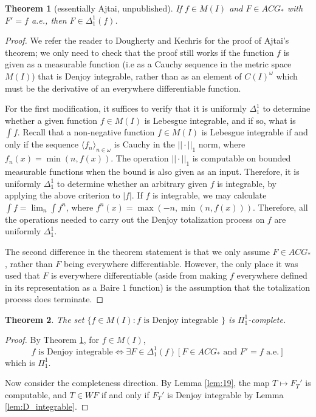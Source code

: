 \documentclass[12pt]{amsart}
\newtheorem{theorem}{Theorem}
\newcommand{\august}[1]{#1}%
\newcommand{\mathaugust}{}%
\begin{document}
\begin{theorem}[essentially Ajtai, unpublished]\label{ajtai}
\august{If $f \in M(I)$ and $F \in ACG_\ast$ with $F' = f$ a.e., then $F \in \Delta^1_1(f)$.}
\end{theorem}
\begin{proof}
\august{We refer the reader to Dougherty and Kechris }\cite[pg. 162]{dk} 
\august{for 
the proof of Ajtai's theorem; we only need to check that the proof 
still works if the function $f$ is 
given as a  
measurable function (i.e as a Cauchy sequence in the 
metric space $M(I)$) that is Denjoy integrable, 
rather than as an element of $C(I)^\omega$
which must be 
the derivative of an everywhere differentiable function.

For the first modification, it suffices to verify that 
it is uniformly $\Delta^1_1$
to determine whether a given function $f \in M(I)$ is
Lebesgue integrable, and if so, what is $\int f$.  
Recall that a 
non-negative function 
$f\in M(I)$ is Lebesgue integrable if and only if the sequence 
$\langle f_n \rangle_{n\in \omega}$ is Cauchy in the $||\cdot||_1$ 
norm, where $f_n(x) = \min(n,f(x))$.  The operation $||\cdot||_1$ 
is computable on bounded measurable functions when the bound is 
also given as an input.  Therefore, it is uniformly $\Delta^1_1$ 
to determine whether an arbitrary given 
$f$ is integrable, by applying 
the above criterion to $|f|$.  If $f$ is integrable, we may calculate
$\int f = \lim_n \int f^n$, where 
$f^n(x) = \max(-n, \min(n, f(x)))$.  
Therefore, all the operations 
needed to carry out the Denjoy totalization process on $f$ 
are uniformly $\Delta^1_1$.

The second difference in the theorem statement is that we only assume 
$F \in ACG_\ast$, rather than $F$ being everywhere differentiable. 
However, the only place it was used that $F$ is everywhere 
differentiable (aside from making $f$ everywhere defined in its  
representation as a Baire 1 function) is the assumption that the 
totalization process does terminate.  }
\end{proof}


\begin{theorem}\label{thm:MI} The set $\{f \in M(I) : f \text{ is Denjoy integrable }\}$ 
is $\Pi^1_1$-complete.
\end{theorem}
\begin{proof}
By Theorem \ref{ajtai}, for $f \in M(I)$,
$$f \text{ is Denjoy integrable} \iff \exists F \in \Delta^1_1(f)[{\mathaugust F \in ACG_\ast \text{ and }} F'=f \text{ a.e.}]$$
which is $\Pi^1_1$.

Now consider the completeness direction.
By Lemma \ref{lem:19}, the map $T\mapsto F_T'$ is computable, 
and $T \in WF$ if and only if $F_T'$ is Denjoy integrable 
by Lemma \ref{lem:D_integrable}.
\end{proof}
\end{document}
